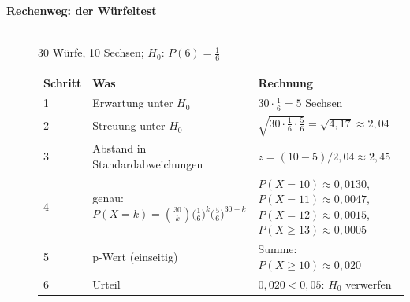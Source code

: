 \begin{description}
\item[{\rot\bf Rechenweg: der Würfeltest}]~\\
30 Würfe, 10 Sechsen; $H_0$: $P(6)=\tfrac16$
\begin{center}
\small
\begin{tabular}{@{}l>{\raggedright\arraybackslash}p{}>{\raggedright\arraybackslash}p{}@{}}
\toprule
\textbf{Schritt} & \textbf{Was} & \textbf{Rechnung} \\
\midrule
1 & Erwartung unter $H_0$ & $30\cdot\tfrac16=5$ Sechsen \\
2 & Streuung unter $H_0$ & $\sqrt{30\cdot\tfrac16\cdot\tfrac56}=\sqrt{4{,}17}\approx2{,}04$ \\
3 & Abstand in Standardabweichungen & $z=(10-5)/2{,}04\approx2{,}45$ \\
4 & genau: $P(X=k)=\binom{30}{k}\bigl(\tfrac16\bigr)^k\bigl(\tfrac56\bigr)^{30-k}$ & $P(X=10)\approx0{,}0130$, $P(X=11)\approx0{,}0047$, $P(X=12)\approx0{,}0015$, $P(X\geq13)\approx0{,}0005$ \\
5 & p-Wert (einseitig) & Summe: $P(X\geq10)\approx0{,}020$ \\
6 & Urteil & $0{,}020<0{,}05$: $H_0$ verwerfen \\
\bottomrule
\end{tabular}
\end{center}
\os{\newpage}
\end{description}

